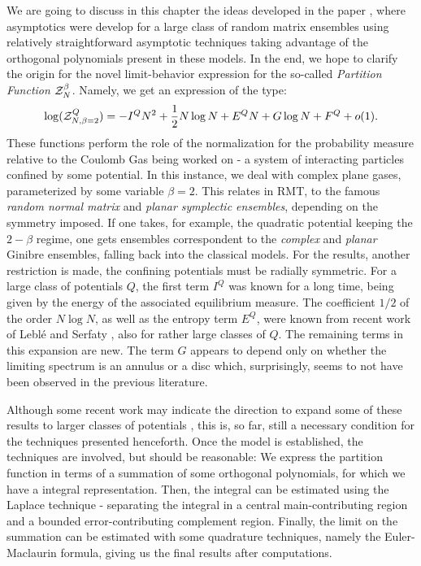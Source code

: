 We are going to discuss in this chapter the ideas developed in the paper \cite{Byun_2023}, where asymptotics were develop for a large class of random matrix ensembles using relatively straightforward asymptotic techniques taking advantage of the orthogonal polynomials present in these models. In the end, we hope to clarify the origin for the novel limit-behavior expression for the so-called \textit{Partition Function} $\mathcal{Z}_{N}^{\beta}$. Namely, we get an expression of the type: 
\begin{equation}
	\log(\mathcal{Z}_{N, \beta=2}^{Q}) = -I^Q N^2+\frac{1}{2} N\log N+E^Q N+G\log N+F^Q + o(1).
\end{equation}
These functions perform the role of the normalization for the probability measure relative to the Coulomb Gas being worked on - a system of interacting particles confined by some potential. In this instance, we deal with complex plane gases, parameterized by some variable $\beta = 2$. This relates in RMT, to the famous \textit{random normal matrix} and \textit{planar symplectic ensembles}, depending on the symmetry imposed. If one takes, for example, the quadratic potential keeping the $2-\beta$ regime, one gets ensembles correspondent to the \textit{complex} and \textit{planar} Ginibre ensembles, falling back into the classical models. For the results, another restriction is made, the confining potentials must be radially symmetric. For a large class of potentials $Q$, the first term $I^Q$ was known for a long time, being given by the energy of the associated equilibrium measure. The coefficient $1/2$ of the order $N\log N$, as well as the entropy term $E^Q$, were known from recent work of Leblé and Serfaty \cite{Leble2017-yj}, also for rather large classes of $Q$. The remaining terms in this expansion are new. The term $G$ appears to depend only on whether the limiting spectrum is an annulus or a disc which, surprisingly, seems to not have been observed in the previous literature. 

Although some recent work may indicate the direction to expand some of these results to larger classes of potentials \cite{hedenmalm2020planarorthogonalpolynomialsboundary}, this is, so far, still a necessary condition for the techniques presented henceforth.  Once the model is established, the techniques are involved, but should be reasonable: We express the partition function in terms of a summation of some orthogonal polynomials, for which we have a integral representation. Then, the integral can be estimated using the Laplace technique - separating the integral in a central main-contributing region and a bounded error-contributing complement region. Finally, the limit on the summation can be estimated with some quadrature techniques, namely the Euler-Maclaurin formula, giving us the final results after computations.

